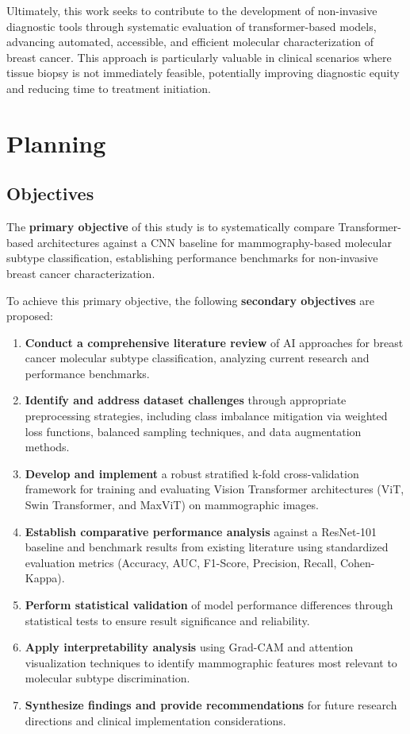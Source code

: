\documentclass[a4paper,10pt]{book}
\begin{document}
Ultimately, this work seeks to contribute to the development of non-invasive diagnostic tools through systematic evaluation of transformer-based models, advancing automated, accessible, and efficient molecular characterization of breast cancer. This approach is particularly valuable in clinical scenarios where tissue biopsy is not immediately feasible, potentially improving diagnostic equity and reducing time to treatment initiation.


\section{Planning}

\subsection{Objectives}

The \textbf{primary objective} of this study is to systematically compare Transformer-based architectures against a CNN baseline for mammography-based molecular subtype classification, establishing performance benchmarks for non-invasive breast cancer characterization.

To achieve this primary objective, the following \textbf{secondary objectives} are proposed:

\begin{enumerate}
	\item \textbf{Conduct a comprehensive literature review} of AI approaches for breast cancer molecular subtype classification, analyzing current research and performance benchmarks.
	\item \textbf{Identify and address dataset challenges} through appropriate preprocessing strategies, including class imbalance mitigation via weighted loss functions, balanced sampling techniques, and data augmentation methods.
	\item \textbf{Develop and implement} a robust stratified k-fold cross-validation framework for training and evaluating Vision Transformer architectures (ViT, Swin Transformer, and MaxViT) on mammographic images.
	\item \textbf{Establish comparative performance analysis} against a ResNet-101 baseline and benchmark results from existing literature using standardized evaluation metrics (Accuracy, AUC, F1-Score, Precision, Recall, Cohen-Kappa).
	\item \textbf{Perform statistical validation} of model performance differences through statistical tests to ensure result significance and reliability.
	\item \textbf{Apply interpretability analysis} using Grad-CAM and attention visualization techniques to identify mammographic features most relevant to molecular subtype discrimination.
	\item \textbf{Synthesize findings and provide recommendations} for future research directions and clinical implementation considerations.
\end{enumerate}
\end{document}

